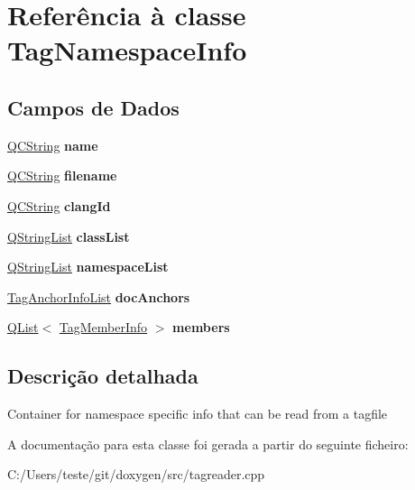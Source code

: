 \hypertarget{class_tag_namespace_info}{\section{Referência à classe Tag\-Namespace\-Info}
\label{class_tag_namespace_info}
}
\subsection*{Campos de Dados}
\begin{DoxyCompactItemize}
\item 
\hypertarget{class_tag_namespace_info_adc0097c7bd1e61ad32058fcde425bc7a}{\hyperlink{class_q_c_string}{Q\-C\-String} {\bfseries name}}\label{class_tag_namespace_info_adc0097c7bd1e61ad32058fcde425bc7a}

\item 
\hypertarget{class_tag_namespace_info_a99a47216e8094a3186f3d837ee0b1c25}{\hyperlink{class_q_c_string}{Q\-C\-String} {\bfseries filename}}\label{class_tag_namespace_info_a99a47216e8094a3186f3d837ee0b1c25}

\item 
\hypertarget{class_tag_namespace_info_a9adedad08b4182d4cb771d92bac11fcc}{\hyperlink{class_q_c_string}{Q\-C\-String} {\bfseries clang\-Id}}\label{class_tag_namespace_info_a9adedad08b4182d4cb771d92bac11fcc}

\item 
\hypertarget{class_tag_namespace_info_af3bb2d0ed4b98f17279d80fdf29f77cb}{\hyperlink{class_q_string_list}{Q\-String\-List} {\bfseries class\-List}}\label{class_tag_namespace_info_af3bb2d0ed4b98f17279d80fdf29f77cb}

\item 
\hypertarget{class_tag_namespace_info_ab4d7297c6d12af6e9780ef8994e6c439}{\hyperlink{class_q_string_list}{Q\-String\-List} {\bfseries namespace\-List}}\label{class_tag_namespace_info_ab4d7297c6d12af6e9780ef8994e6c439}

\item 
\hypertarget{class_tag_namespace_info_a3a6c53fe1869a01e3748ec5898a54458}{\hyperlink{class_tag_anchor_info_list}{Tag\-Anchor\-Info\-List} {\bfseries doc\-Anchors}}\label{class_tag_namespace_info_a3a6c53fe1869a01e3748ec5898a54458}

\item 
\hypertarget{class_tag_namespace_info_acab433535ad1575dfbddf6796d2baf98}{\hyperlink{class_q_list}{Q\-List}$<$ \hyperlink{class_tag_member_info}{Tag\-Member\-Info} $>$ {\bfseries members}}\label{class_tag_namespace_info_acab433535ad1575dfbddf6796d2baf98}

\end{DoxyCompactItemize}


\subsection{Descrição detalhada}
Container for namespace specific info that can be read from a tagfile 

A documentação para esta classe foi gerada a partir do seguinte ficheiro\-:\begin{DoxyCompactItemize}
\item 
C\-:/\-Users/teste/git/doxygen/src/tagreader.\-cpp\end{DoxyCompactItemize}
